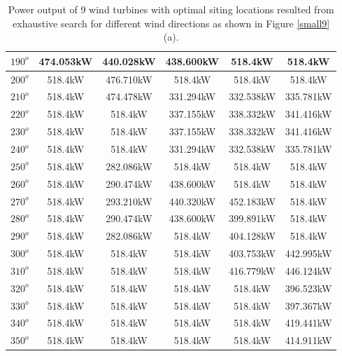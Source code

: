 \begin{table}[H]
\begin{tabular}{|c|c|c|c|c|c|}
        		$190^o$	& 474.053kW	& 440.028kW	& 438.600kW	& 518.4kW	& 518.4kW	\\ \hline
        		$200^o$	& 518.4kW	& 476.710kW	& 518.4kW	& 518.4kW	& 518.4kW	\\ \hline
        		$210^o$	& 518.4kW	& 474.478kW	& 331.294kW	& 332.538kW	& 335.781kW	\\ \hline
        		$220^o$	& 518.4kW	& 518.4kW	& 337.155kW	& 338.332kW	& 341.416kW	\\ \hline
        		$230^o$	& 518.4kW	& 518.4kW	& 337.155kW	& 338.332kW	& 341.416kW	\\ \hline
        		$240^o$	& 518.4kW	& 518.4kW	& 331.294kW	& 332.538kW	& 335.781kW	\\ \hline
        		$250^o$	& 518.4kW	& 282.086kW	& 518.4kW	& 518.4kW	& 518.4kW	\\ \hline
        		$260^o$	& 518.4kW	& 290.474kW	& 438.600kW	& 518.4kW	& 518.4kW	\\ \hline
        		$270^o$	& 518.4kW	& 293.210kW	& 440.320kW	& 452.183kW	& 518.4kW	\\ \hline
        		$280^o$	& 518.4kW	& 290.474kW	& 438.600kW	& 399.891kW	& 518.4kW	\\ \hline
        		$290^o$	& 518.4kW	& 282.086kW	& 518.4kW	& 404.128kW	& 518.4kW	\\ \hline
        		$300^o$	& 518.4kW	& 518.4kW	& 518.4kW	& 403.753kW	& 442.995kW	\\ \hline
        		$310^o$	& 518.4kW	& 518.4kW	& 518.4kW	& 416.779kW	& 446.124kW	\\ \hline
        		$320^o$	& 518.4kW	& 518.4kW	& 518.4kW	& 518.4kW	& 396.523kW	\\ \hline
        		$330^o$	& 518.4kW	& 518.4kW	& 518.4kW	& 518.4kW	& 397.367kW	\\ \hline
        		$340^o$	& 518.4kW	& 518.4kW	& 518.4kW	& 518.4kW	& 419.441kW	\\ \hline
        		$350^o$	& 518.4kW	& 518.4kW	& 518.4kW	& 518.4kW	& 414.911kW	\\ \hline
        	\end{tabular}
        	\caption{Power output of 9 wind turbines with optimal siting locations resulted from exhaustive search for different wind directions as shown in Figure \ref{small9} (a).}
        	\label{table9a}
        \end{table}
